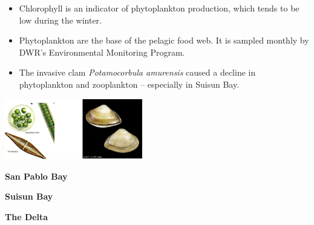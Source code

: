 \documentclass[]{article}\usepackage[]{graphicx}\usepackage[]{color}
\begin{document}
\begin{Row}
  \begin{Cell}{8}
    \begin{center}
      {\large 
        \begin{itemize}[leftmargin=2cm,rightmargin=2cm]
          \item Chlorophyll is an indicator of phytoplankton production, which tends 
          to be low during the winter.
          \item Phytoplankton are the base of the pelagic food web. It is sampled 
          monthly by DWR's Environmental Monitoring Program.
          \item The invasive clam {\em Potamocorbula amurensis} caused a decline in 
          phytoplankton and zooplankton -- especially in Suisun Bay.
        \end{itemize}
      }
    \end{center}
  \end{Cell}

  \begin{Cell}{2}
    \includegraphics[width=6cm,align=m]{figures/chlorophyll/chlorophyll_pics.png}
  \end{Cell}
\end{Row}

\vspace{30pt}

\begin{Row}
  \begin{Cell}{4}
    \begin{center}
      {\Large {\bf San Pablo Bay}}
    \end{center}
  \end{Cell}
  \begin{Cell}{4}
    \begin{center}
      {\Large {\bf Suisun Bay}}
    \end{center}
  \end{Cell}
  \begin{Cell}{4}
    \begin{center}
      {\Large {\bf The Delta}}
    \end{center}
  \end{Cell}
\end{Row}
\end{document}

